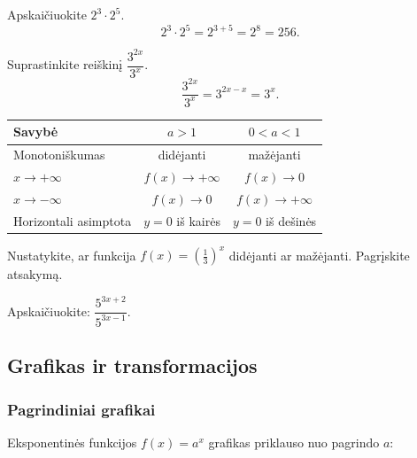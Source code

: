 \begin{example}
Apskaičiuokite $2^3 \cdot 2^5$.
\[
    2^3 \cdot 2^5 = 2^{3+5} = 2^8 = 256.
\]
\end{example}

\begin{example}
Suprastinkite reiškinį $\dfrac{3^{2x}}{3^x}$.
\[
    \frac{3^{2x}}{3^x} = 3^{2x - x} = 3^x.
\]
\end{example}

\begin{tcolorbox}[title=Pagrindų palyginimas]
\centering
\begin{tabular}{|l|c|c|}
\hline
\textbf{Savybė} & $a > 1$ & $0 < a < 1$ \\
\hline
Monotoniškumas & didėjanti & mažėjanti \\
$x \to +\infty$ & $f(x) \to +\infty$ & $f(x) \to 0$ \\
$x \to -\infty$ & $f(x) \to 0$ & $f(x) \to +\infty$ \\
Horizontali asimptota & $y = 0$ iš kairės & $y = 0$ iš dešinės \\
\hline
\end{tabular}
\end{tcolorbox}

\begin{exercise}
Nustatykite, ar funkcija $f(x) = \left(\tfrac{1}{3}\right)^x$ didėjanti ar
mažėjanti. Pagrįskite atsakymą.
\end{exercise}

\begin{exercise}
Apskaičiuokite: $\dfrac{5^{3x+2}}{5^{3x-1}}$.
\end{exercise}

\subsection{Grafikas ir transformacijos}

\subsubsection*{Pagrindiniai grafikai}

Eksponentinės funkcijos $f(x) = a^x$ grafikas priklauso nuo pagrindo $a$:

